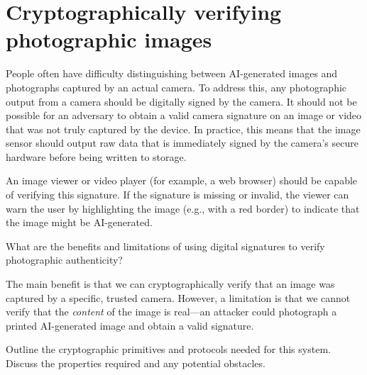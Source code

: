 \chapter{Cryptographically verifying photographic images}\label{CameraSignature}

People often have difficulty distinguishing between AI-generated images and
photographs captured by an actual camera.
To address this, any photographic output from a camera should be digitally
signed by the camera.
It should not be possible for an adversary to obtain a valid camera signature
on an image or video that was not truly captured by the device.
In practice, this means that the image sensor should output raw data that is
immediately signed by the camera's secure hardware before being written to
storage.

An image viewer or video player (for example, a web browser) should be capable
of verifying this signature.
If the signature is missing or invalid, the viewer can warn the user by
highlighting the image (e.g., with a red border) to indicate that the image
might be AI-generated.

\begin{exercise}\label{CameraSignatureBenefits}
  What are the benefits and limitations of using digital signatures to
  verify photographic authenticity?
\end{exercise}

The main benefit is that we can cryptographically verify that an image was
captured by a specific, trusted camera.
However, a limitation is that we cannot verify that the \emph{content} of the
image is real---an attacker could photograph a printed AI-generated image
and obtain a valid signature.

\begin{exercise}\label{CameraSignatureDesign}
  Outline the cryptographic primitives and protocols needed for this system.
  Discuss the properties required and any potential obstacles.
\end{exercise}

